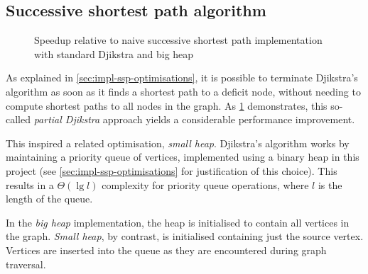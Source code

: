 %
%
%
%
%
%
%
\subsection{Successive shortest path algorithm}

\begin{figure}
    \centering
    \caption{Speedup relative to naive successive shortest path implementation with standard Djikstra and big heap}
    \label{fig:opt-ap}
\end{figure}

As explained in \cref{sec:impl-ssp-optimisations}, it is possible to terminate Djikstra's algorithm as soon as it finds a shortest path to a deficit node, without needing to compute shortest paths to all nodes in the graph. As \cref{fig:opt-ap} demonstrates, this so-called \emph{partial Djikstra} approach yields a considerable performance improvement.

This inspired a related optimisation, \emph{small heap}. Djikstra's algorithm works by maintaining a priority queue of vertices, implemented using a binary heap in this project (see \cref{sec:impl-ssp-optimisations} for justification of this choice). This results in a $\Theta\left(\lg l\right)$ complexity for priority queue operations, where $l$ is the length of the queue.

In the \emph{big heap} implementation, the heap is initialised to contain all vertices in the graph. \emph{Small heap}, by contrast, is initialised containing just the source vertex. Vertices are inserted into the queue as they are encountered during graph traversal.

